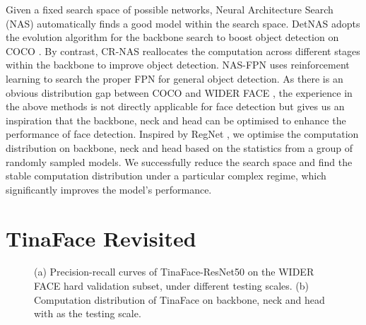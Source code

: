 \documentclass[10pt,twocolumn,letterpaper]{article}
\begin{document}
 Given a fixed search space of possible networks, Neural Architecture Search (NAS) automatically finds a good model within the search space. DetNAS \cite{chen2019detnas} adopts the evolution algorithm for the backbone search to boost object detection on COCO \cite{lin2014microsoft}. By contrast, CR-NAS \cite{liang2019computation} reallocates the computation across different stages within the backbone to improve object detection. NAS-FPN \cite{ghiasi2019fpn} uses reinforcement learning to search the proper FPN for general object detection. As there is an obvious distribution gap between COCO \cite{lin2014microsoft} and WIDER FACE \cite{yang2016wider}, the experience in the above methods is not directly applicable for face detection but gives us an inspiration that the backbone, neck and head can be optimised to enhance the performance of face detection. Inspired by RegNet \cite{radosavovic2020designing}, we optimise the computation distribution on backbone, neck and head based on the statistics from a group of randomly sampled models. We successfully reduce the search space and find the stable computation distribution under a particular complex regime, which significantly improves the model's performance.

\section{TinaFace Revisited}

\begin{figure*}[t!]
\centering
{}
\caption{(a) Precision-recall curves of TinaFace-ResNet50 on the WIDER FACE hard validation subset, under different testing scales. (b) Computation distribution of TinaFace on backbone, neck and head with  as the testing scale.}
\vspace{-4mm}
\label{fig:tinafacerevisited}
\end{figure*}

\begin{table}[t]
\small
\centering
{}
\caption{Performance and computation comparisons of TinaFace under different testing scales. The average scale of original images is around .}
\label{tab:tinafacedifscale}
\end{table}
\end{document}
